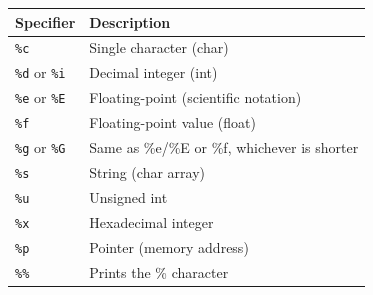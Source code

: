 \documentclass[a4paper, 10pt]{article}
\begin{document}
\begin{center}
    \begin{tabular}{|l|l|}
        \hline
        Specifier                    & Description                                  \\
        \hline
        \texttt{\%c}                 & Single character (char)                      \\
        \hline
        \texttt{\%d} or \texttt{\%i} & Decimal integer (int)                        \\
        \hline
        \texttt{\%e} or \texttt{\%E} & Floating-point (scientific notation)         \\
        \hline
        \texttt{\%f}                 & Floating-point value (float)                 \\
        \hline
        \texttt{\%g} or \texttt{\%G} & Same as \%e/\%E or \%f, whichever is shorter \\
        \hline
        \texttt{\%s}                 & String (char array)                          \\
        \hline
        \texttt{\%u}                 & Unsigned int                                 \\
        \hline
        \texttt{\%x}                 & Hexadecimal integer                          \\
        \hline
        \texttt{\%p}                 & Pointer (memory address)                     \\
        \hline
        \texttt{\%\%}                & Prints the \% character                      \\
        \hline
    \end{tabular}
\end{center}
\pagebreak
\end{document}
